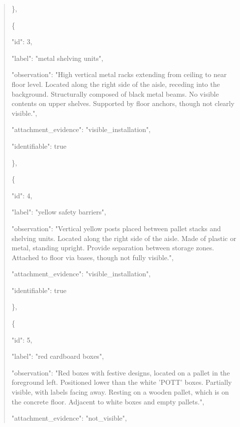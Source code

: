 \documentclass[10pt,a4paper]{article}
\begin{document}
\begin{quote}
    \},\allowbreak{}\par
    \{\par
      "id":\allowbreak{} 3,\allowbreak{}\par
      "label":\allowbreak{} "metal shelving units",\allowbreak{}\par
      "observation":\allowbreak{} "High vertical metal racks extending from ceiling to near floor level. Located along the right side of the aisle,\allowbreak{} receding into the background. Structurally composed of black metal beams. No visible contents on upper shelves. Supported by floor anchors,\allowbreak{} though not clearly visible.",\allowbreak{}\par
      "attachment\_evidence":\allowbreak{} "visible\_installation",\allowbreak{}\par
      "identifiable":\allowbreak{} true\par
    \},\allowbreak{}\par
    \{\par
      "id":\allowbreak{} 4,\allowbreak{}\par
      "label":\allowbreak{} "yellow safety barriers",\allowbreak{}\par
      "observation":\allowbreak{} "Vertical yellow posts placed between pallet stacks and shelving units. Located along the right side of the aisle. Made of plastic or metal,\allowbreak{} standing upright. Provide separation between storage zones. Attached to floor via bases,\allowbreak{} though not fully visible.",\allowbreak{}\par
      "attachment\_evidence":\allowbreak{} "visible\_installation",\allowbreak{}\par
      "identifiable":\allowbreak{} true\par
    \},\allowbreak{}\par
    \{\par
      "id":\allowbreak{} 5,\allowbreak{}\par
      "label":\allowbreak{} "red cardboard boxes",\allowbreak{}\par
      "observation":\allowbreak{} "Red boxes with festive designs,\allowbreak{} located on a pallet in the foreground left. Positioned lower than the white 'POTT' boxes. Partially visible,\allowbreak{} with labels facing away. Resting on a wooden pallet,\allowbreak{} which is on the concrete floor. Adjacent to white boxes and empty pallets.",\allowbreak{}\par
      "attachment\_evidence":\allowbreak{} "not\_visible",\allowbreak{}\par

\end{quote}
\end{document}
